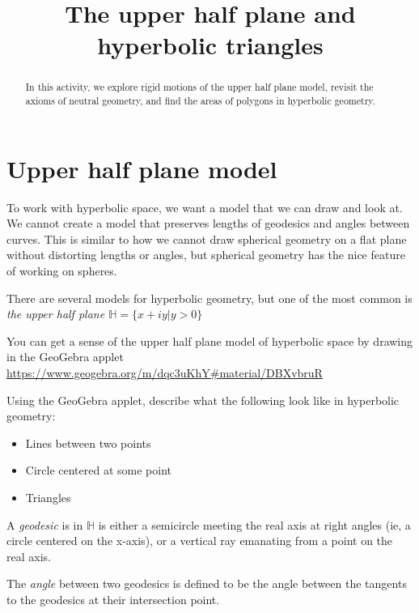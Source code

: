 \documentclass[newpage,hints,handout]{ximera}
\title{The upper half plane and hyperbolic triangles}
\begin{document}
\begin{abstract}
In this activity, we explore rigid motions of the upper half plane model, revisit the axioms of neutral geometry, and find the areas of polygons in hyperbolic geometry.
\end{abstract}
\maketitle


\section{Upper half plane model}

To work with hyperbolic space, we want a model that we can draw and look at. We cannot create a model that preserves lengths of geodesics and angles between curves. This is similar to how we cannot draw spherical geometry on a flat plane without distorting lengths or angles, but spherical geometry has the nice feature of working on spheres.

There are several models for hyperbolic geometry, but one of the most common is \emph{the upper half plane $\mathbb{H}=\{x+iy|y>0\}$}

You can get a sense of the upper half plane model of hyperbolic space by drawing in the GeoGebra applet \url{https://www.geogebra.org/m/dqc3uKhY#material/DBXvbruR}

\begin{problem}
 Using the GeoGebra applet, describe what the following look like in hyperbolic geometry:
 
\begin{itemize}
 \item Lines between two points
 \item Circle centered at some point
 \item Triangles
\end{itemize}
\end{problem}

\begin{definition}
  A \emph{geodesic} is in $\mathbb{H}$ is either a semicircle meeting the real axis
at right angles (ie, a circle centered on the x-axis), or a vertical ray emanating from a point on the real axis. 
\end{definition}

\begin{definition}
 The \emph{angle} between two geodesics is defined to be the angle between
the tangents to the geodesics at their intersection point. 
\end{definition}
\end{document}
